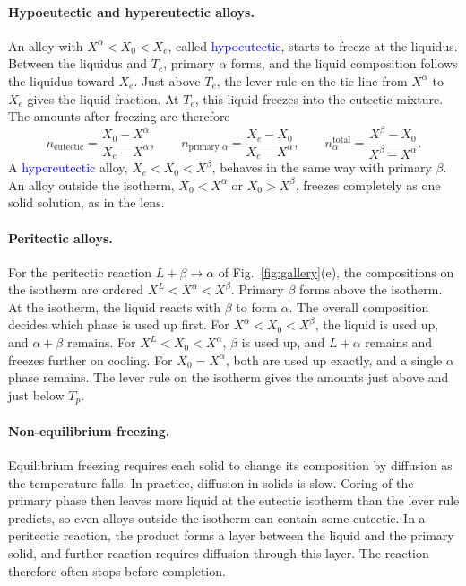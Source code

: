 \paragraph{Hypoeutectic and hypereutectic alloys.}
An alloy with $X^\alpha<X_0<X_e$, called \textcolor{blue}{hypoeutectic},
starts to freeze at the liquidus. Between the liquidus and $T_e$, primary
$\alpha$ forms, and the liquid composition follows the liquidus toward
$X_e$. Just above $T_e$, the lever rule on the tie line from $X^\alpha$ to
$X_e$ gives the liquid fraction. At $T_e$, this liquid freezes into the
eutectic mixture. The amounts after freezing are therefore
\begin{equation}
    \boxed{n_{\text{eutectic}}=\frac{X_0-X^\alpha}{X_e-X^\alpha},\qquad
    n_{\text{primary }\alpha}=\frac{X_e-X_0}{X_e-X^\alpha},\qquad
    n_\alpha^{\text{total}}=\frac{X^\beta-X_0}{X^\beta-X^\alpha}.}
\end{equation}
A \textcolor{blue}{hypereutectic} alloy, $X_e<X_0<X^\beta$, behaves in the
same way with primary $\beta$. An alloy outside the isotherm, $X_0<X^\alpha$
or $X_0>X^\beta$, freezes completely as one solid solution, as in the lens.

\paragraph{Peritectic alloys.}
For the peritectic reaction $L+\beta\to\alpha$ of
Fig.~\ref{fig:gallery}(e), the compositions on the isotherm are ordered
$X^L<X^\alpha<X^\beta$. Primary $\beta$ forms above the isotherm. At the
isotherm, the liquid reacts with $\beta$ to form $\alpha$. The overall
composition decides which phase is used up first. For $X^\alpha<X_0<X^\beta$,
the liquid is used up, and $\alpha+\beta$ remains. For $X^L<X_0<X^\alpha$,
$\beta$ is used up, and $L+\alpha$ remains and freezes further on cooling. For
$X_0=X^\alpha$, both are used up exactly, and a single $\alpha$ phase
remains. The lever rule on the isotherm gives the amounts just above and
just below $T_p$.

\paragraph{Non-equilibrium freezing.}
Equilibrium freezing requires each solid to change its composition by
diffusion as the temperature falls. In practice, diffusion in solids is slow.
Coring of the primary phase then leaves more liquid at the eutectic isotherm
than the lever rule predicts, so even alloys outside the isotherm can contain
some eutectic. In a peritectic reaction, the product forms a layer between
the liquid and the primary solid, and further reaction requires diffusion
through this layer. The reaction therefore often stops before completion.

